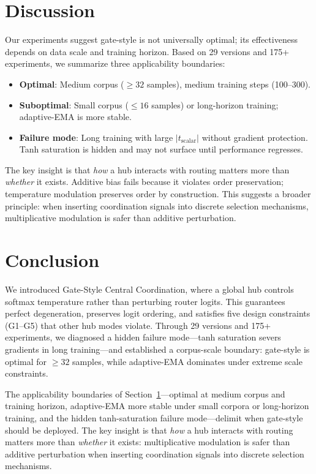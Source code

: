 \documentclass[10pt,twoside]{article}
\theoremstyle{definition}
\begin{document}
\section{Discussion}
\label{sec:discussion}

Our experiments suggest gate-style is not universally optimal; its effectiveness depends on data scale and training horizon. Based on 29 versions and 175+ experiments, we summarize three applicability boundaries:

\begin{itemize}
    \item \textbf{Optimal}: Medium corpus ($\geq 32$ samples), medium training steps (100--300).
    \item \textbf{Suboptimal}: Small corpus ($\leq 16$ samples) or long-horizon training; adaptive-EMA is more stable.
    \item \textbf{Failure mode}: Long training with large $|t_{\text{scalar}}|$ without gradient protection. Tanh saturation is hidden and may not surface until performance regresses.
\end{itemize}

The key insight is that \textit{how} a hub interacts with routing matters more than \textit{whether} it exists. Additive bias fails because it violates order preservation; temperature modulation preserves order by construction. This suggests a broader principle: when inserting coordination signals into discrete selection mechanisms, multiplicative modulation is safer than additive perturbation.

\section{Conclusion}

We introduced Gate-Style Central Coordination, where a global hub controls softmax temperature rather than perturbing router logits. This guarantees perfect degeneration, preserves logit ordering, and satisfies five design constraints (G1--G5) that other hub modes violate. Through 29 versions and 175+ experiments, we diagnosed a hidden failure mode---tanh saturation severs gradients in long training---and established a corpus-scale boundary: gate-style is optimal for $\geq 32$ samples, while adaptive-EMA dominates under extreme scale constraints.

The applicability boundaries of Section~\ref{sec:discussion}---optimal at medium corpus and training horizon, adaptive-EMA more stable under small corpora or long-horizon training, and the hidden tanh-saturation failure mode---delimit when gate-style should be deployed. The key insight is that \textit{how} a hub interacts with routing matters more than \textit{whether} it exists: multiplicative modulation is safer than additive perturbation when inserting coordination signals into discrete selection mechanisms.
\end{document}
